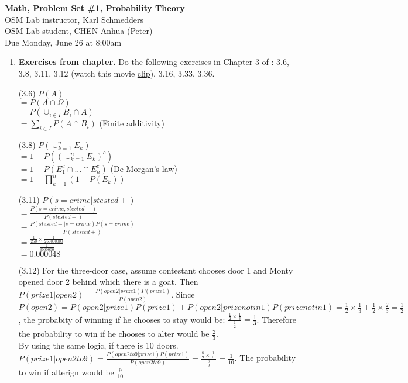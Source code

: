 \documentclass[letterpaper,12pt]{article}
\theoremstyle{definition}
\begin{document}
\begin{flushleft}
   \textbf{\large{Math, Problem Set \#1, Probability Theory}} \\[5pt]
   OSM Lab instructor, Karl Schmedders \\[5pt]
   OSM Lab student, CHEN Anhua (Peter)\\[5pt]
   Due Monday, June 26 at 8:00am
\end{flushleft}

\vspace{5mm}

\begin{enumerate}
	\item {\bf Exercises from chapter.} Do the following exercises in Chapter 3 of \citet{HJ17}: 3.6, 3.8, 3.11, 3.12 (watch this movie \href{https://www.youtube.com/watch?v=Zr_xWfThjJ0}{clip}), 3.16, 3.33, 3.36.
			\item[(3.6)]
			$P(A)$\\
			$= P(A \cap \Omega)$\\
			$= P(\cup_{i \in I} B_i \cap A)$\\
			$= \sum_{i \in I} P(A \cap B_i)$  (Finite additivity)

			\item[(3.8)]
			$P(\cup_{k = 1}^{n} E_k)$\\
			$= 1 - P((\cup_{k = 1}^{n} E_k)^c)$\\
			$= 1 - P(E_1^c \cap ... \cap E_n^c)$  (De Morgan's law)\\
			$= 1 - \prod_{k = 1}^{n} (1 - P(E_k))$\\

			\item[(3.11)]
			$P(s = crime | s tested+)$\\
			$= \frac{P(s = crime, s tested+)}{P(s tested +)}$\\
			$= \frac{P(s tested+ | s = crime)P(s = crime)}{P(s tested +)}$\\
			$= \frac{\frac{1}{250} \times \frac{1}{250000000} }{\frac{1}{3000000}}$\\
			$= 0.000048$\\


			\item[(3.12)]
			For the three-door case, assume contestant chooses door 1 and Monty opened door 2 behind which there is a goat. Then $P(prize 1 | open 2) = \frac{P(open 2 | prize 1)P(prize 1)}{P(open 2)}$. Since $P(open 2) = P(open 2 | prize 1)P(prize 1) + P(open 2 | prize not in 1)P(prize not in 1) = \frac{1}{2}\times \frac{1}{3} + \frac{1}{2}\times \frac{2}{3} = \frac{1}{2}$, the probabity of winning if he chooses to stay would be: $\frac{\frac{1}{2} \times \frac{1}{3}}{\frac{1}{2}} = \frac{1}{3}$. Therefore the probability to win if he chooses to alter would be $\frac{2}{3}$.\\
			By using the same logic, if there is 10 doors. $P(prize 1 | open 2 to 9) = \frac{P(open 2 to 9 | prize 1)P(prize 1)}{P(open 2 to 9)} = \frac{\frac{8}{9} \times \frac{1}{10}}{\frac{8}{9}} = \frac{1}{10}$. The probability to win if alterign would be $\frac{9}{10}$



\end{enumerate}
\end{document}
